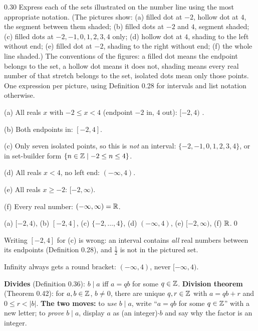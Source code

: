 \begin{bookex}[recommended]{0.30}
Express each of the sets illustrated on the number line using the most appropriate notation. (The pictures show: (a) filled dot at $-2$, hollow dot at $4$, the segment between them shaded; (b) filled dots at $-2$ and $4$, segment shaded; (c) filled dots at $-2,-1,0,1,2,3,4$ only; (d) hollow dot at $4$, shading to the left without end; (e) filled dot at $-2$, shading to the right without end; (f) the whole line shaded.)
\solution
\given The conventions of the figures: a filled dot means the endpoint belongs to the set, a hollow dot means it does not, shading means every real number of that stretch belongs to the set, isolated dots mean only those points.
\goal One expression per picture, using Definition 0.28 for intervals and list notation otherwise.
\begin{steps}
\item (a) All reals $x$ with $-2\le x<4$ (endpoint $-2$ in, $4$ out): $[-2,4)$ .
\item (b) Both endpoints in: $[-2,4]$.
\item (c) Only seven isolated points, so this is \emph{not} an interval: $\{-2,-1,0,1,2,3,4\}$, or in set-builder form $\{n\in\mathbb{Z}\mid-2\le n\le4\}$.
\item (d) All reals $x<4$, no left end: $(-\infty,4)$.
\item (e) All reals $x\ge-2$: $[-2,\infty)$.
\item (f) Every real number: $(-\infty,\infty)=\mathbb{R}$.
\end{steps}
\conclusion (a) $[-2,4)$, (b) $[-2,4]$, (c) $\{-2,\dots,4\}$, (d) $(-\infty,4)$, (e) $[-2,\infty)$, (f) $\mathbb{R}$.\qed
\begin{compare}
\item Writing $[-2,4]$ for (c) is wrong: an interval contains \emph{all} real numbers between its endpoints (Definition 0.28), and $\frac12$ is not in the pictured set.
\item Infinity always gets a round bracket: $(-\infty,4)$, never $[-\infty,4)$.
\end{compare}
\end{bookex}


\begin{key}
\textbf{Divides} (Definition 0.36): $b\mid a$ iff $a=qb$ for some $q\in\mathbb{Z}$. \textbf{Division theorem} (Theorem 0.42): for $a,b\in\mathbb{Z}$, $b\ne0$, there are unique $q,r\in\mathbb{Z}$ with $a=qb+r$ and $0\le r<|b|$. \textbf{The two moves:} to \emph{use} $b\mid a$, write ``$a=qb$ for some $q\in\mathbb{Z}$'' with a new letter; to \emph{prove} $b\mid a$, display $a$ as (an integer)$\cdot b$ and say why the factor is an integer.
\end{key}

